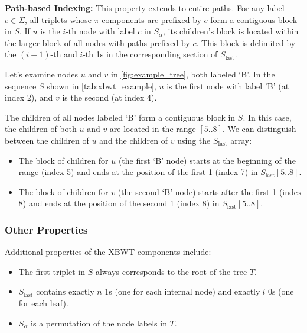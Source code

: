 \textbf{Path-based Indexing:} This property extends to entire paths. For any label $c \in \Sigma$, all triplets whose $\pi$-components are prefixed by $c$ form a contiguous block in $S$. If $u$ is the $i$-th node with label $c$ in $S_{\alpha}$, its children's block is located within the larger block of all nodes with paths prefixed by $c$. This block is delimited by the $(i-1)$-th and $i$-th 1s in the corresponding section of $S_{\text{last}}$. \label{prop3}
\begin{example}
    Let's examine nodes $u$ and $v$ in \cref{fig:example_tree}, both labeled `B'. In the sequence $S$ shown in \cref{tab:xbwt_example}, $u$ is the first node with label 'B' (at index 2), and $v$ is the second (at index 4).

    The children of all nodes labeled `B' form a contiguous block in $S$. In this case, the children of both $u$ and $v$ are located in the range $[5..8]$. We can distinguish between the children of $u$ and the children of $v$ using the $S_{\text{last}}$ array:
    \begin{itemize}
        \item The block of children for $u$ (the first `B' node) starts at the beginning of the range (index 5) and ends at the position of the first 1 (index 7) in $S_{\text{last}}[5..8]$.
        \item The block of children for $v$ (the second `B' node) starts after the first 1 (index 8) and ends at the position of the second 1 (index 8) in $S_{\text{last}}[5..8]$.
    \end{itemize}
\end{example}

\subsubsection{Other Properties}
Additional properties of the XBWT components include:

\begin{itemize}
    \item The first triplet in $S$ always corresponds to the root of the tree $T$.
    \item $S_{\text{last}}$ contains exactly $n$ 1s (one for each internal node) and exactly $l$ 0s (one for each leaf).
    \item $S_{\alpha}$ is a permutation of the node labels in $T$.
\end{itemize}


